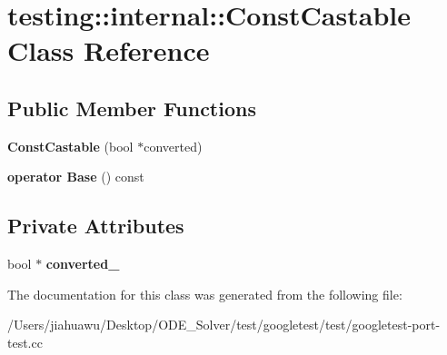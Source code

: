 \hypertarget{classtesting_1_1internal_1_1_const_castable}{}\section{testing\+:\+:internal\+:\+:Const\+Castable Class Reference}
\label{classtesting_1_1internal_1_1_const_castable}
\subsection*{Public Member Functions}
\begin{DoxyCompactItemize}
\item 
\mbox{\label{classtesting_1_1internal_1_1_const_castable_a78eba470cc71528237a33a10a92fba7e}} 
{\bfseries Const\+Castable} (bool $\ast$converted)
\item 
\mbox{\label{classtesting_1_1internal_1_1_const_castable_af084893d6786010022297b1e88f4743b}} 
{\bfseries operator Base} () const
\end{DoxyCompactItemize}
\subsection*{Private Attributes}
\begin{DoxyCompactItemize}
\item 
\mbox{\label{classtesting_1_1internal_1_1_const_castable_afd56f08fe3748a6223b62bceb585ab6a}} 
bool $\ast$ {\bfseries converted\+\_\+}
\end{DoxyCompactItemize}


The documentation for this class was generated from the following file\+:\begin{DoxyCompactItemize}
\item 
/\+Users/jiahuawu/\+Desktop/\+O\+D\+E\+\_\+\+Solver/test/googletest/test/googletest-\/port-\/test.\+cc\end{DoxyCompactItemize}
